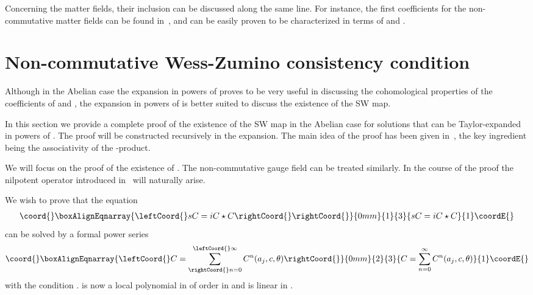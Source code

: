 \documentclass[a4paper,12pt]{article}
\begin{document}
Concerning the matter fields, their inclusion can
 be discussed along the same line. For instance, the first coefficients
 for the non-commutative matter fields can be found in~\cite{Jurco:2001rq},
 and can be easily proven to be characterized in terms of \coordHE{} and \coordHE{}.

\section{Non-commutative Wess-Zumino consistency condition} \label{sec:WZ}

Although in the Abelian case the expansion in powers of \coordHE{} proves
 to be very useful in discussing the cohomological properties of the
 coefficients of \coordHE{} and \coordHE{}, the expansion in powers of \myHighlight{$\theta$}\coordHE{}
 is better suited to discuss the existence of the SW map.

In this section we provide a complete proof of the existence
 of the SW map in the Abelian case for solutions
 that can be Taylor-expanded in  powers of \myHighlight{$\theta$}\coordHE{}.
The proof will be constructed recursively in the \myHighlight{$\theta$}\coordHE{} expansion.
The main idea of the proof has been given in~\cite{stora},
 the key ingredient being the associativity of the \myHighlight{$\star$}\coordHE{}-product.

We will focus on the proof of the existence of \coordHE{}. The non-commutative
 gauge field \coordHE{} can be treated  similarly.
In the course of the proof the nilpotent operator \myHighlight{$\Delta$}\coordHE{} introduced 
 in~\cite{Brace:2001fj} will naturally arise. 

We wish to prove that the equation
%
\begin{eqnarray}\coord{}\boxAlignEqnarray{\leftCoord{}
s C = i C \star C \rightCoord{}
\label{e37}
\rightCoord{}}{0mm}{1}{3}{
s C = i C \star C 
}{1}\coordE{}\end{eqnarray}
%
can be solved by a formal power series
%
\begin{eqnarray}\coord{}\boxAlignEqnarray{\leftCoord{}
C = \sum_{\rightCoord{}n=0}^{\leftCoord{}\infty} C^n(a_j,c,\theta)
\label{e38}
\rightCoord{}}{0mm}{2}{3}{
C = \sum_{n=0}^{\infty} C^n(a_j,c,\theta)
}{1}\coordE{}\end{eqnarray}
%
with the condition \coordHE{}. \coordHE{} is now a local polynomial 
 in \coordHE{} of order \coordHE{} in \myHighlight{$\theta$}\coordHE{} and is linear in \coordHE{}.
\end{document}

